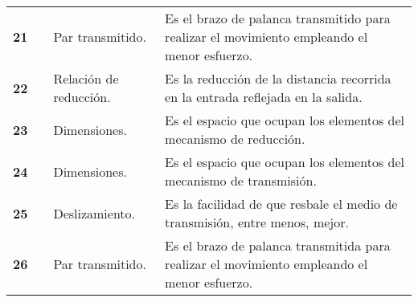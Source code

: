 \begin{table}[H]
\begin{tabular}{|c|c|p{10em}|p{21em}|}
		\cline{1-1}\cline{3-4}    \textbf{ 21} &       &  Par transmitido. &  Es el brazo de palanca transmitido para realizar el movimiento empleando el menor esfuerzo. \\
		\cline{1-1}\cline{3-4}    \textbf{ 22} &       &  Relación de reducción. &  Es la reducción de la distancia recorrida en la entrada reflejada en la salida. \\
		\cline{1-1}\cline{3-4}    \textbf{ 23} &       &  Dimensiones. &  Es el espacio que ocupan los elementos del mecanismo de reducción. \\
		\cline{1-1}\cline{3-4}    \textbf{ 24} &       &  Dimensiones. &  Es el espacio que ocupan los elementos del mecanismo de transmisión. \\
		\cline{1-1}\cline{3-4}    \textbf{ 25} &       &  Deslizamiento. &  Es la facilidad de que resbale el medio de transmisión, entre menos, mejor. \\
		\cline{1-1}\cline{3-4}    \textbf{ 26} &       &  Par transmitido. &  Es el brazo de palanca transmitida para realizar el movimiento empleando el menor esfuerzo. \\
		\hline
	\end{tabular}%
	\label{tab:addlabel}%
\end{table}%

\newpage

